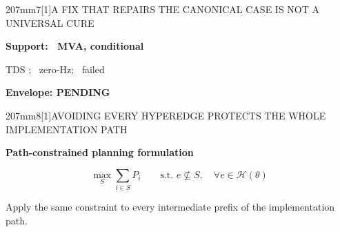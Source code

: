 \documentclass[final]{beamer}
\newcommand{\Subhead}{\PosterCondensed\bfseries\fontsize{38pt}{41pt}\selectfont}
\newcommand{\TableSize}{\fontsize{26pt}{29pt}\selectfont}
\newcommand{\FigureSize}{\fontsize{24.7pt}{27.2pt}\selectfont}
\begin{document}
\begin{frame}[t]
\begin{minipage}[t][207mm][t]{450mm}
\begin{PosterPanel}{207mm}{7}{\scalebox{0.79}[1]{A FIX THAT REPAIRS THE CANONICAL CASE IS NOT A UNIVERSAL CURE}}
\begin{minipage}[t]{215mm}
    \end{minipage}\par
    \vspace{1mm}
    \noindent\begin{minipage}[c][10mm][c]{92mm}\centering
      {\FigureSize\bfseries\color{IASGray}\MonteCarloReviewStatus}
    \end{minipage}\hfill
    \begin{minipage}[c][10mm][c]{103mm}\centering
      {\FigureSize\bfseries\color{IASGold!70!black}Support: \CondenserMVA\ MVA, conditional}
    \end{minipage}\hfill
    \begin{minipage}[c][10mm][c]{155mm}\centering
      {\FigureSize\color{IASDarkText}TDS \TDSAgreement; \TDSZeroHzDisagreements\ zero-Hz; \TDSSolverFailures\ failed}
    \end{minipage}\hfill
    \begin{minipage}[c][10mm][c]{82mm}\centering
      {\FigureSize\bfseries\color{IASGray}Envelope: PENDING}
    \end{minipage}\par
  \end{PosterPanel}
\end{minipage}\hspace{4mm}%
\begin{minipage}[t][207mm][t]{448mm}\vspace{0pt}
  \begin{PosterPanel}{207mm}{8}{\scalebox{0.70}[1]{AVOIDING EVERY HYPEREDGE PROTECTS THE WHOLE IMPLEMENTATION PATH}}
    {\Subhead\color{IASDarkGreen}Path-constrained planning formulation\par}
    \vspace{-8mm}
    {\fontsize{38pt}{42pt}\selectfont
     \setlength{\abovedisplayskip}{2mm}\setlength{\belowdisplayskip}{1mm}
     \setlength{\abovedisplayshortskip}{1mm}\setlength{\belowdisplayshortskip}{1mm}
     \[
      \max_{S}\sum_{i\in S}P_i\qquad
      \text{s.t. } e\nsubseteq S,\quad \forall e\in\mathcal H(\theta)
    \]}
    {\TableSize\color{IASDarkText}Apply the same constraint to every intermediate prefix of the implementation path.\par}

\end{PosterPanel}
\end{minipage}
\end{frame}
\end{document}
